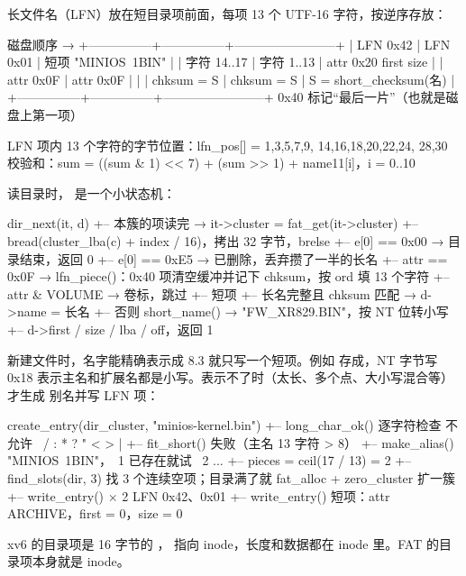 长文件名（LFN）放在短目录项前面，每项 13 个 UTF-16 字符，按逆序存放：

\begin{txtcode}
磁盘顺序 →
+---------------+---------------+------------------------+
| LFN  0x42     | LFN  0x01     | 短项 "MINIOS~1BIN"     |
| 字符 14..17   | 字符 1..13    | attr 0x20 first size   |
| attr 0x0F     | attr 0x0F     |                        |
| chksum = S    | chksum = S    | S = short_checksum(名) |
+---------------+---------------+------------------------+
  0x40 标记“最后一片”（也就是磁盘上第一项）

LFN 项内 13 个字符的字节位置：lfn_pos[] = {1,3,5,7,9, 14,16,18,20,22,24, 28,30}
校验和：sum = ((sum & 1) << 7) + (sum >> 1) + name11[i]，i = 0..10
\end{txtcode}

读目录时， 是一个小状态机：

\begin{txtcode}
dir_next(it, d)
+-- 本簇的项读完 → it->cluster = fat_get(it->cluster)
+-- bread(cluster_lba(c) + index / 16)，拷出 32 字节，brelse
+-- e[0] == 0x00   → 目录结束，返回 0
+-- e[0] == 0xE5   → 已删除，丢弃攒了一半的长名
+-- attr == 0x0F   → lfn_piece()：0x40 项清空缓冲并记下 chksum，按 ord 填 13 个字符
+-- attr & VOLUME  → 卷标，跳过
+-- 短项
    +-- 长名完整且 chksum 匹配 → d->name = 长名
    +-- 否则 short_name()     → "FW_XR829.BIN"，按 NT 位转小写
    +-- d->first / size / lba / off，返回 1
\end{txtcode}

新建文件时，名字能精确表示成 8.3 就只写一个短项。例如  存成，NT 字节写 0x18 表示主名和扩展名都是小写。表示不了时（太长、多个点、大小写混合等）才生成  别名并写 LFN 项：

\begin{txtcode}[basicstyle=\ttfamily\scriptsize]
create_entry(dir_cluster, "minios-kernel.bin")
+-- long_char_ok() 逐字符检查         不允许 \ / : * ? " < > |
+-- fit_short() 失败（主名 13 字符 > 8）
+-- make_alias()                       "MINIOS~1BIN"，~1 已存在就试 ~2 ...
+-- pieces = ceil(17 / 13) = 2
+-- find_slots(dir, 3)                 找 3 个连续空项；目录满了就 fat_alloc + zero_cluster 扩一簇
+-- write_entry() × 2                  LFN 0x42、0x01
+-- write_entry()                      短项：attr ARCHIVE，first = 0，size = 0
\end{txtcode}

xv6 的目录项是 16 字节的 ， 指向 inode，长度和数据都在 inode 里。FAT 的目录项本身就是 inode。

